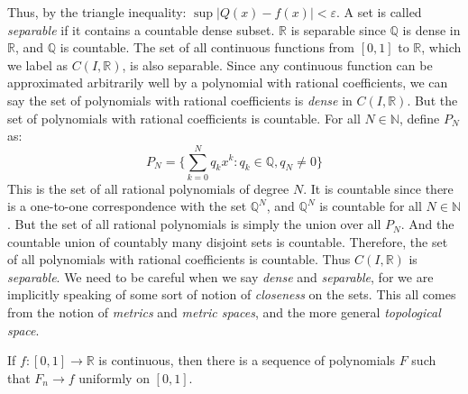 \documentclass[crop=false,class=book,oneside]{standalone}
\begin{document}
            Thus, by the triangle inequality:
            $\sup|Q(x)-f(x)|<\varepsilon$. A set is called
            \textit{separable} if it
            contains a countable dense subset. $\mathbb{R}$
            is separable since $\mathbb{Q}$ is dense in
            $\mathbb{R}$, and $\mathbb{Q}$ is countable.
            The set of all continuous functions from
            $[0,1]$ to $\mathbb{R}$, which we label as
            $C(I,\mathbb{R})$, is also separable.
            Since any continuous function can be approximated
            arbitrarily well by a polynomial with rational
            coefficients, we can say the set of polynomials
            with rational coefficients is \textit{dense} in
            $C(I,\mathbb{R})$. But the set of polynomials with
            rational coefficients is countable. For all
            $N\in\mathbb{N}$, define $P_{N}$ as:
            \begin{equation}
                    P_{N}=\Big\{\sum_{k=0}^{N}
                    q_{k}x^{k}:q_{k}\in\mathbb{Q},
                    q_{N}\ne{0}\Big\}
                \end{equation}
            This is the set of all rational polynomials
            of degree $N$. It is countable since there is
            a one-to-one correspondence with
            the set $\mathbb{Q}^{N}$, and $\mathbb{Q}^{N}$
            is countable for all $N\in\mathbb{N}$. But the
            set of all rational polynomials is simply the
            union over all $P_{N}$. And the countable union
            of countably many disjoint sets is countable.
            Therefore, the set of all polynomials with
            rational coefficients is countable. Thus
            $C(I,\mathbb{R})$ is \textit{separable}. We need
            to be careful when we say \textit{dense} and
            \textit{separable}, for we are implicitly speaking
            of some sort of notion of \textit{closeness} on the
            sets. This all comes from the notion of
            \textit{metrics} and \textit{metric spaces},
            and the more general \textit{topological space}.
            \begin{theorem}
                \label{thm:Funct:Weierstrass_%
                       Approx_on_unit_interval}
                If $f:[0,1]\rightarrow\mathbb{R}$ is
                continuous, then there is a sequence
                of polynomials $F$ such that
                $F_{n}\rightarrow{f}$ uniformly on $[0,1]$.
            \end{theorem}
\end{document}
